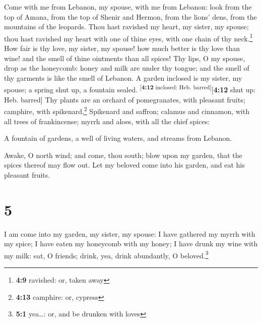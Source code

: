  Come with me from Lebanon, my spouse, with me from
Lebanon: look from the top of Amana, from the top of Shenir and Hermon,
from the lions' dens, from the mountains of the leopards. 
Thou hast ravished my heart, my sister, my spouse; thou hast ravished my
heart with one of thine eyes, with one chain of thy neck.\footnote{\textbf{4:9}
  ravished: or, taken away}  How fair is thy love, my
sister, my spouse! how much better is thy love than wine! and the smell
of thine ointments than all spices!  Thy lips, O my
spouse, drop as the honeycomb: honey and milk are under thy tongue; and
the smell of thy garments is like the smell of Lebanon. 
A garden inclosed is my sister, my spouse; a spring shut up, a fountain
sealed. \textsuperscript{{[}\textbf{4:12} inclosed: Heb.
barred{]}}{[}\textbf{4:12} shut up: Heb. barred{]}  Thy
plants are an orchard of pomegranates, with pleasant fruits; camphire,
with spikenard,\footnote{\textbf{4:13} camphire: or, cypress}
 Spikenard and saffron; calamus and cinnamon, with all
trees of frankincense; myrrh and aloes, with all the chief spices:

 A fountain of gardens, a well of living waters, and
streams from Lebanon.

 Awake, O north wind; and come, thou south; blow upon my
garden, that the spices thereof may flow out. Let my beloved come into
his garden, and eat his pleasant fruits.

\hypertarget{section-4}{%
\section{5}\label{section-4}}

 I am come into my garden, my sister, my spouse: I have
gathered my myrrh with my spice; I have eaten my honeycomb with my
honey; I have drunk my wine with my milk: eat, O friends; drink, yea,
drink abundantly, O beloved.\footnote{\textbf{5:1} yea\ldots: or, and be
  drunken with loves}

